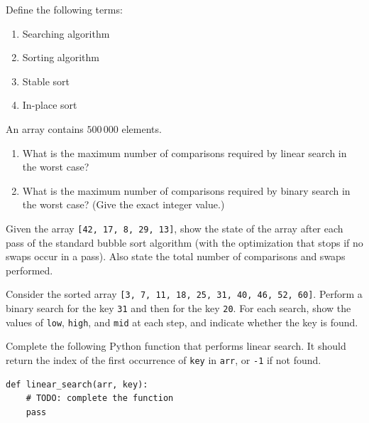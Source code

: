 \documentclass[11pt]{article}
\newcounter{popsec}
\newcounter{popsub}
\newcommand{\courssub}[1]{%
  \stepcounter{popsub}%
  \par\vspace{9pt}\noindent{\popxbold\fontsize{11.5}{13}\selectfont\color{popink}{\color{poporange}\thepopsec.\thepopsub}\hspace{6pt}#1}\par\nopagebreak\vspace{4pt}
}
\begin{document}
\begin{exercice}[Definitions]
Define the following terms:
\begin{enumerate}
\item Searching algorithm
\item Sorting algorithm
\item Stable sort
\item In-place sort
\end{enumerate}
\end{exercice}

\begin{exercice}
An array contains $500\,000$ elements.
\begin{enumerate}
\item What is the maximum number of comparisons required by linear search in the worst case?
\item What is the maximum number of comparisons required by binary search in the worst case? (Give the exact integer value.)
\end{enumerate}
\end{exercice}

\courssub{I practise}
\begin{exercice}
Given the array \texttt{[42, 17, 8, 29, 13]}, show the state of the array after each pass of the standard bubble sort algorithm (with the optimization that stops if no swaps occur in a pass). Also state the total number of comparisons and swaps performed.
\end{exercice}

\begin{exercice}
Consider the sorted array \texttt{[3, 7, 11, 18, 25, 31, 40, 46, 52, 60]}. Perform a binary search for the key \texttt{31} and then for the key \texttt{20}. For each search, show the values of \texttt{low}, \texttt{high}, and \texttt{mid} at each step, and indicate whether the key is found.
\end{exercice}

\begin{exercice}
Complete the following Python function that performs linear search. It should return the index of the first occurrence of \texttt{key} in \texttt{arr}, or \texttt{-1} if not found.
\begin{verbatim}
def linear_search(arr, key):
    # TODO: complete the function
    pass
\end{verbatim}
\end{exercice}
\end{document}
